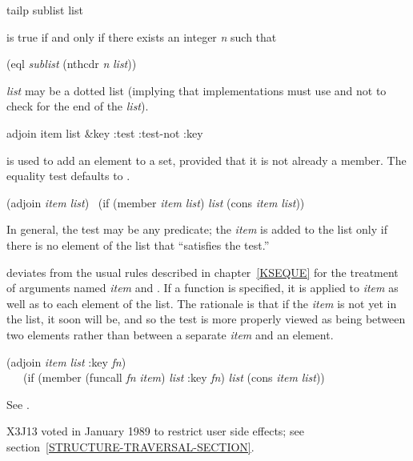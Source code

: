 \begin{defun}[Function]
tailp sublist list

 is true if and only if there exists an integer \emph{n} such that
\begin{lisp}
(eql \emph{sublist} (nthcdr \emph{n} \emph{list}))
\end{lisp}
\emph{list} may be a dotted list (implying that
implementations must use  and not  to check for
the end of the \emph{list}).
\end{defun}

\begin{defun}[Function]
adjoin item list &key :test :test-not :key

 is used to add an element to a set, provided that
it is not already a member.  The equality test defaults to .
\begin{lisp}
(adjoin \emph{item} \emph{list}) \EQ\ (if (member \emph{item} \emph{list}) \emph{list} (cons \emph{item} \emph{list}))
\end{lisp}
In general, the test may be any predicate; the \emph{item} is added to the
list only if there is no element of the list that ``satisfies the test.''

 deviates from the usual rules described in chapter~\ref{KSEQUE}
for the treatment of arguments named \emph{item} and .
If a  function is specified, it is applied to \emph{item}
as well as to each element of the list.  The rationale is that
if the \emph{item} is not yet in the list, it soon will be, and so
the test is more properly viewed as being between two elements
rather than between a separate \emph{item} and an element.
\begin{lisp}
(adjoin \emph{item} \emph{list} :key \emph{fn}) \\
~~\EQ\ (if (member (funcall \emph{fn} \emph{item}) \emph{list}
  :key \emph{fn}) \emph{list} (cons \emph{item} \emph{list})) 
\end{lisp}
See .

\begin{new}
X3J13 voted in January 1989
to restrict user side effects; see section~\ref{STRUCTURE-TRAVERSAL-SECTION}.
\end{new}
\end{defun}

